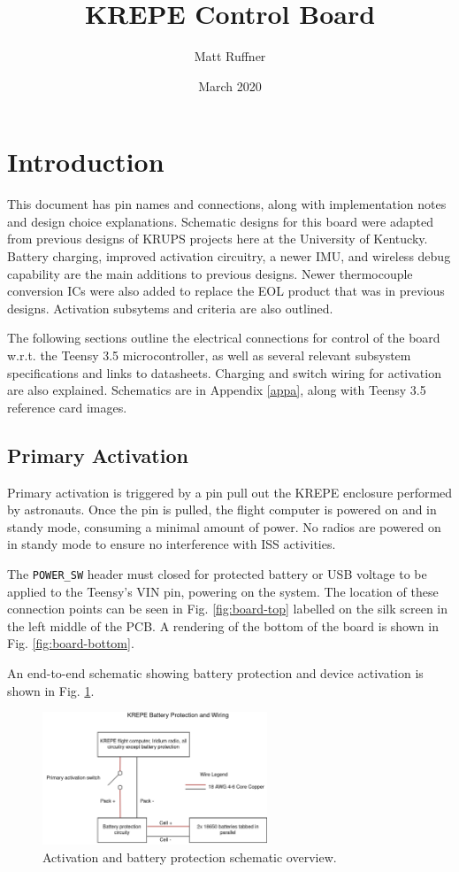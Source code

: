 \documentclass{article}
\title{KREPE Control Board}
\author{Matt Ruffner}
\date{March 2020}
\begin{document}
\maketitle
\tableofcontents
\newpage
\listoffigures
\listoftables
\newpage

\section{Introduction}

This document has pin names and connections, along with implementation notes and design choice explanations. Schematic designs for this board were adapted from previous designs of KRUPS projects here at the University of Kentucky. Battery charging, improved activation circuitry, a newer IMU, and wireless debug capability are the main additions to previous designs. Newer thermocouple conversion ICs were also added to replace the EOL product that was in previous designs. Activation subsytems and criteria are also outlined.

The following sections outline the electrical connections for control of the board w.r.t. the Teensy 3.5 microcontroller, as well as several relevant subsystem specifications and links to datasheets. Charging and switch wiring for activation are also explained. Schematics are in Appendix \ref{appa}, along with Teensy 3.5 reference card images.

\subsection{Primary Activation}
Primary activation is triggered by a pin pull out the KREPE enclosure performed by astronauts. Once the pin is pulled, the flight computer is powered on and in standy mode, consuming a minimal amount of power. No radios are powered on in standy mode to ensure no interference with ISS activities. 

The \texttt{POWER\_SW} header must closed for protected battery or USB voltage to be applied to the Teensy's VIN pin, powering on the system. The location of these connection points can be seen in Fig. \ref{fig:board-top} labelled on the silk screen in the left middle of the PCB. A rendering of the bottom of the board is shown in Fig. \ref{fig:board-bottom}.

An end-to-end schematic showing battery protection and device activation is shown in Fig. \ref{fig:activation-circuitry}.

\begin{figure}[H]
    \centering
    \includegraphics[width=0.6\textwidth]{images/krepe-electrical-overview.png}
    \caption{Activation and battery protection schematic overview.}
    \label{fig:activation-circuitry}
\end{figure}
\end{document}
